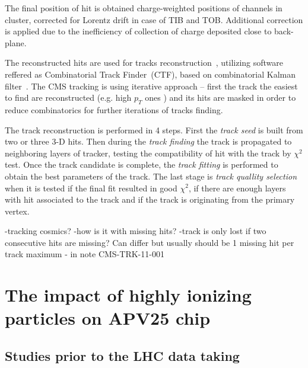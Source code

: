The final position of hit is obtained charge-weighted positions of channels in cluster, corrected for Lorentz drift in case of TIB and TOB. Additional correction is applied due to the inefficiency of collection of charge deposited close to back-plane.

The reconstructed hits are used for tracks reconstruction~\cite{Chatrchyan:2014fea}, utilizing software reffered as Combinatorial Track Finder~(CTF), based on combinatorial Kalman filter~\cite{Fruhwirth:1987fm}. The CMS tracking is using iterative approach -- first the track the easiest to find are reconstructed (e.g. high $p_{T}$ ones ) and its hits are masked in order to reduce combinatorics for further iterations of tracks finding.


The track reconstruction is performed in 4 steps. First the \textit{track seed} is built from two or three 3-D hits. Then during the \textit{track finding} the track is propagated to neighboring layers of tracker, testing the compatibility of hit with the track by $\chi^{2}$ test. Once the track candidate is complete, the \textit{track fitting} is performed to obtain the best parameters of the track. The last stage is \textit{track quallity selection} when it is tested if the final fit resulted in good $\chi^{2}$, if there are enough layers with hit associated to the track and if the track is originating from the primary vertex.

-tracking cosmics?
-how is it with missing hits? -track is only lost if two consecutive hits are missing? Can differ but usually should be 1 missing hit per track maximum -  in note CMS-TRK-11-001


\section{The impact of highly ionizing particles on APV25 chip}



\subsection{Studies prior to the LHC data taking}

